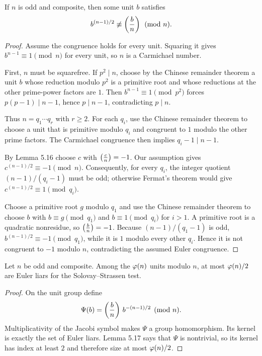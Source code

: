 \begin{lem}
If $n$ is odd and composite, then some unit $b$ satisfies
\[
 b^{(n-1)/2}\not\equiv\left(\frac{b}{n}\right)\pmod n.
\]
\end{lem}
\begin{proof}
Assume the congruence holds for every unit.  Squaring it gives
$b^{n-1}\equiv1\pmod n$ for every unit, so $n$ is a Carmichael number.

First, $n$ must be squarefree.  If $p^2\mid n$, choose by the Chinese remainder theorem a unit $b$ whose reduction modulo $p^2$ is a primitive root and whose reductions at the other prime-power factors are $1$.  Then
$b^{n-1}\equiv1\pmod{p^2}$ forces $p(p-1)\mid n-1$, hence $p\mid n-1$, contradicting $p\mid n$.

Thus $n=q_1\cdots q_r$ with $r\ge2$.  For each $q_i$, use the Chinese remainder theorem to choose a unit that is primitive modulo $q_i$ and congruent to $1$ modulo the other prime factors.  The Carmichael congruence then implies
$q_i-1\mid n-1$.

By Lemma 5.16 choose $c$ with $\left(\frac{c}{n}\right)=-1$.  Our assumption gives
$c^{(n-1)/2}\equiv-1\pmod n$.  Consequently, for every $q_i$, the integer quotient $(n-1)/(q_i-1)$ must be odd; otherwise Fermat's theorem would give $c^{(n-1)/2}\equiv1\pmod{q_i}$.

Choose a primitive root $g$ modulo $q_1$ and use the Chinese remainder theorem to choose $b$ with
$b\equiv g\pmod{q_1}$ and $b\equiv1\pmod{q_i}$ for $i>1$.  A primitive root is a quadratic nonresidue, so $\left(\frac{b}{n}\right)=-1$.  Because $(n-1)/(q_1-1)$ is odd,
$b^{(n-1)/2}\equiv-1\pmod{q_1}$, while it is $1$ modulo every other $q_i$.  Hence it is not congruent to $-1$ modulo $n$, contradicting the assumed Euler congruence.
\end{proof}

\begin{thm}
Let $n$ be odd and composite.  Among the $\varphi(n)$ units modulo $n$, at most $\varphi(n)/2$ are Euler liars for the Solovay--Strassen test.
\end{thm}
\begin{proof}
On the unit group define
\[
 \Psi(b)=\left(\frac{b}{n}\right)\, b^{-(n-1)/2}\pmod n.
\]
Multiplicativity of the Jacobi symbol makes $\Psi$ a group homomorphism.  Its kernel is exactly the set of Euler liars.  Lemma 5.17 says that $\Psi$ is nontrivial, so its kernel has index at least $2$ and therefore size at most $\varphi(n)/2$.
\end{proof}
